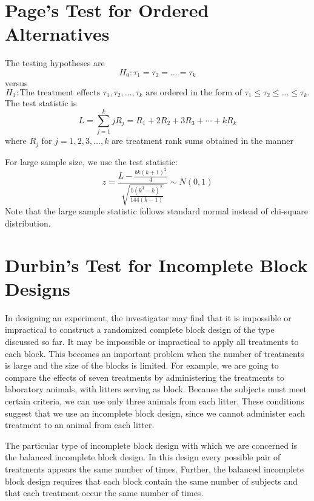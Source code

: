 \section{Page's Test for Ordered Alternatives}

\begin{definition}
    The testing hypotheses are 
    \[
        H_0 : \tau_1 = \tau_2 = \ldots = \tau_k
    \]
    versus
    \[
        H_1: \text{The treatment effects } \tau_1, \tau_2, \ldots, \tau_k \text{ are ordered in the form of } \tau_1 \leq \tau_2 \leq \ldots \leq \tau_k.
    \]
    The test statistic is 
    \[
        L = \sum^k_{j = 1} jR_j = R_1 + 2R_2 + 3R_3 + \cdots + kR_k
    \]
    where $R_j$ for $j = 1, 2, 3, \ldots, k$ are treatment rank sums obtained in the manner
\end{definition}

\begin{theorem}
    For large sample size, we use the test statistic:
    \begin{equation}
        z = \frac{\displaystyle L - \frac{bk(k+1)^2}{4} }{\sqrt{\displaystyle \frac{b(k^3 - k)^2}{144(k-1)}}} \sim N(0,1)
    \end{equation}
    Note that the large sample statistic follows standard normal instead of chi-square distribution.
\end{theorem}

\section{Durbin's Test for Incomplete Block Designs}

In designing an experiment, the investigator may find that it is impossible or impractical to
construct a randomized complete block design of the type discussed so far. It may be impossible or
impractical to apply all treatments to each block. This becomes an important problem when the
number of treatments is large and the size of the blocks is limited. For example, we are going to
compare the effects of seven treatments by administering the treatments to laboratory animals, with
litters serving as block. Because the subjects must meet certain criteria, we can use only three
animals from each litter. These conditions suggest that we use an incomplete block design, since we
cannot administer each treatment to an animal from each litter.

The particular type of incomplete block design with which we are concerned is the balanced
incomplete block design. In this design every possible pair of treatments appears the same number
of times. Further, the balanced incomplete block design requires that each block contain the same
number of subjects and that each treatment occur the same number of times.